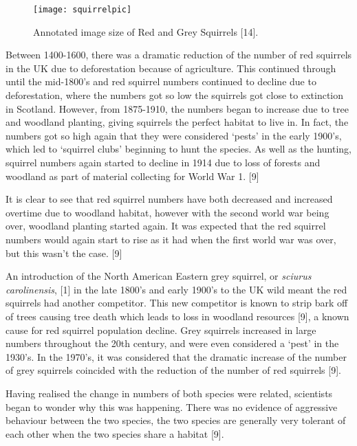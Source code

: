 \documentclass{article}
\begin{document}
\begin{figure}[H]
\begin{center}
\texttt{[image: squirrelpic]}
\caption{Annotated image size of Red and Grey Squirrels [14].}
\end{center}
\end{figure}

Between 1400-1600, there was a dramatic reduction of the number of red squirrels in the UK due to deforestation because of agriculture. This continued through until the mid-1800’s and red squirrel numbers continued to decline due to deforestation, where the numbers got so low the squirrels got close to extinction in Scotland. However, from 1875-1910, the numbers began to increase due to tree and woodland planting, giving squirrels the perfect habitat to live in. In fact, the numbers got so high again that they were considered ‘pests’ in the early 1900’s, which led to ‘squirrel clubs’ beginning to hunt the species. As well as the hunting, squirrel numbers again started to decline in 1914 due to loss of forests and woodland as part of material collecting for World War 1. [9]

It is clear to see that red squirrel numbers have both decreased and increased overtime due to woodland habitat, however with the second world war being over, woodland planting started again. It was expected that the red squirrel numbers would again start to rise as it had when the first world war was over, but this wasn’t the case. [9]

An introduction of the North American Eastern grey squirrel, or \emph{sciurus carolinensis}, [1] in the late 1800’s and early 1900’s to the UK wild meant the red squirrels had another competitor. This new competitor is known to strip bark off of trees causing tree death which leads to loss in woodland resources [9], a known cause for red squirrel population decline. Grey squirrels increased in large numbers throughout the 20th century, and were even considered a ‘pest’ in the 1930’s. In the 1970’s, it was considered that the dramatic increase of the number of grey squirrels coincided with the reduction of the number of red squirrels [9].

Having realised the change in numbers of both species were related, scientists began to wonder why this was happening. There was no evidence of aggressive behaviour between the two species, the two species are generally very tolerant of each other when the two species share a habitat [9].
\end{document}
